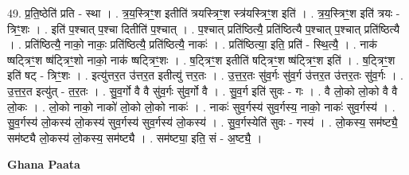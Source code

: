 \documentclass[17pt]{extarticle}
\begin{document}
49. प्र॒ति॒ष्ठेति॑ प्रति - स्था । . त्र॒य॒स्त्रिꣳ॒॒श इतीति॑ त्रयस्त्रिꣳ॒॒श स्त्र॑यस्त्रिꣳ॒॒श इति॑ । . त्र॒य॒स्त्रिꣳ॒॒श इति॑ त्रयः - त्रिꣳ॒॒शः । . इति॑ प॒श्चात् प॒श्चा दितीति॑ प॒श्चात् । . प॒श्चात् प्रति॑ष्ठित्यै॒ प्रति॑ष्ठित्यै प॒श्चात् प॒श्चात् प्रति॑ष्ठित्यै । . प्रति॑ष्ठित्यै॒ नाको॒ नाकः॒ प्रति॑ष्ठित्यै॒ प्रति॑ष्ठित्यै॒ नाकः॑ । . प्रति॑ष्ठित्या॒ इति॒ प्रति॑ - स्थि॒त्यै॒ । . नाक॑ ष्षट्त्रिꣳ॒॒श ष्ष॑ट्त्रिꣳ॒॒शो नाको॒ नाक॑ ष्षट्त्रिꣳ॒॒शः । . ष॒ट्त्रिꣳ॒॒श इतीति॑ षट्त्रिꣳ॒॒श ष्ष॑ट्त्रिꣳ॒॒श इति॑ । . ष॒ट्त्रिꣳ॒॒श इति॑ षट् - त्रिꣳ॒॒शः । . इत्यु॑त्तर॒त उ॑त्तर॒त इतीत्यु॑ त्तर॒तः । . उ॒त्त॒र॒तः सु॑व॒र्गः सु॑व॒र्ग उ॑त्तर॒त उ॑त्तर॒तः सु॑व॒र्गः । . उ॒त्त॒र॒त इत्यु॑त् - त॒र॒तः । . सु॒व॒र्गो वै वै सु॑व॒र्गः सु॑व॒र्गो वै । . सु॒व॒र्ग इति॑ सुवः - गः । . वै लो॒को लो॒को वै वै लो॒कः । . लो॒को नाको॒ नाको॑ लो॒को लो॒को नाकः॑ । . नाकः॑ सुव॒र्गस्य॑ सुव॒र्गस्य॒ नाको॒ नाकः॑ सुव॒र्गस्य॑ । . सु॒व॒र्गस्य॑ लो॒कस्य॑ लो॒कस्य॑ सुव॒र्गस्य॑ सुव॒र्गस्य॑ लो॒कस्य॑ । . सु॒व॒र्गस्येति॑ सुवः - गस्य॑ । . लो॒कस्य॒ सम॑ष्ट्यै॒ सम॑ष्ट्यै लो॒कस्य॑ लो॒कस्य॒ सम॑ष्ट्यै । . सम॑ष्ट्या॒ इति॒ सं - अ॒ष्ट्यै॒ । \newline

\textbf{Ghana Paata } \newline
\end{document}
